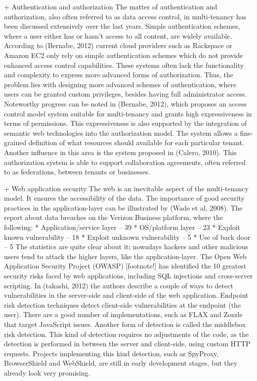 + Authentication and authorization
The matter of authentication and authorization, also often referred to as data access control, in multi-tenancy has been discussed extensively over the last years. Simple authentication schemes, where a user either has or hasn’t access to all content, are widely available. According to (Bernabe, 2012) current cloud providers such as Rackspace or Amazon EC2 only rely on simple authentication schemes which do not provide enhanced access control capabilities. These systems often lack the functionality and complexity to express more advanced forms of authorization. Thus, the problem lies with designing more advanced schemes of authentication, where users can be granted custom privileges, besides having full administrator access.
Noteworthy progress can be noted in (Bernabe, 2012), which proposes an access control model system suitable for multi-tenancy and grants high expressiveness in terms of permissions. This expressiveness is also supported by the integration of semantic web technologies into the authorization model. The system allows a fine-grained definition of what resources should available for each particular tenant. Another influence in this area is the system proposed in (Calero, 2010). This authorization system is able to support collaboration agreements, often referred to as federations, between tenants or businesses.

+ Web application security
The web is an inevitable aspect of the multi-tenancy model. It ensures the accessibility of the data. The importance of good security practices in the application-layer can be illustrated by (Wade et al, 2008). The report about data breaches on the Verizon Business platform, where the following:
* Application/service layer – 39%
* OS/platform layer – 23%
* Exploit known vulnerability – 18%
* Exploit unknown vulnerability – 5%
* Use of back door – 5%
The statistics are quite clear about it; nowadays hackers and other malicious users tend to attack the higher layers, like the application-layer. The Open Web Application Security Project (OWASP) [footnote!] has identified the 10 greatest security risks faced by web applications, including SQL injections and cross-server scripting. 
In (takashi, 2012) the authors describe a couple of ways to detect vulnerabilities in the server-side and client-side of the web application. Endpoint risk detection techniques detect client-side vulnerabilities at the endpoint (the user). There are a good number of implementations, such as FLAX and Zozzle that target JavaScript issues. Another form of detection is called the middlebox risk detection. This kind of detection requires no adjustments of the code, as the detection is performed in between the server and client-side, using custom HTTP requests. Projects implementing this kind detection, such as SpyProxy, BrowserShield and WebShield, are still in early development stages, but they already look very promising.

